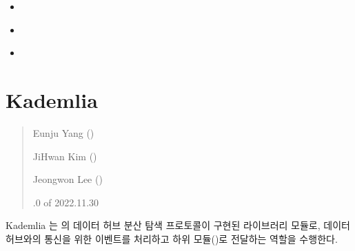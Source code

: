 \documentclass[a4paper,10pt,english]{sphinxmanual}
\begin{document}
\begin{fulllineitems}
\begin{fulllineitems}
\nopagebreak

\begin{itemize}
\item {} 
\sphinxAtStartPar
{\hyperref[\detokenize{_DHSearch:DHSearch._updateInterestInfo}]{}}

\item {} 
\sphinxAtStartPar
{\hyperref[\detokenize{_DHSearch:DHSearch._bootstrapProcess}]{}}

\item {} 
\sphinxAtStartPar
{\hyperref[\detokenize{_DHSearch:DHSearch._discoverProcess}]{}}

\end{itemize}



\end{fulllineitems}


\end{fulllineitems}


\sphinxstepscope


\section{Kademlia}
\label{\detokenize{_kademlia:kademlia}}\label{\detokenize{_kademlia:id1}}\label{\detokenize{_kademlia::doc}}\begin{quote}\begin{description}
\begin{DUlineblock}{0em}
\item[] Eunju Yang ()
\item[] JiHwan Kim ()
\item[] Jeongwon Lee ()
\end{DUlineblock}

.0 of 2022.11.30

\end{description}\end{quote}

\sphinxAtStartPar
Kademlia 는 {\hyperref[\detokenize{_DHSearch:dhsearch}]{}} 의 데이터 허브 분산 탐색 프로토콜이 구현된 라이브러리 모듈로, 데이터 허브와의 통신을 위한 이벤트를 처리하고 하위 모듈()로 전달하는 역할을 수행한다.
\end{document}
